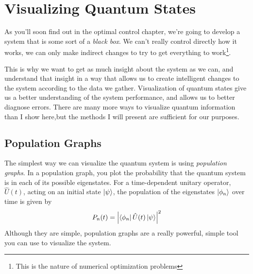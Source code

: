 
\section{Visualizing Quantum States}
As you'll soon find out in the optimal control chapter, we're going to develop a system that is some sort of a \textit{black box}. We can't really control directly how it works, we can only make indirect changes to try to get everything to work\footnote{This is the nature of numerical optimization problems}.

This is why we want to get as much insight about the system as we can, and understand that insight in a way that allows us to create intelligent changes to the system according to the data we gather. Visualization of quantum states give us a better understanding of the system performance, and allows us to better diagnose errors. There are many more ways to visualize quantum information than I show here,but the methods I will present are sufficient for our purposes.

\subsection{Population Graphs}
The simplest way we can visualize the quantum system is using \textit{population graphs}. In a population graph, you plot the probability that the quantum system is in each of its possible eigenstates. For a time-dependent unitary operator, $\hat{U} (t)$, acting on an initial state $\ket{\psi}$, the population of the eigenstates $\ket{\phi_n}$ over time is given by
\[
    P_n (t) = \abs{\bra{\phi_n}\hat{U} (t)\ket{\psi}}^2
\]
Although they are simple, population graphs are a really powerful, simple tool you can use to visualize the system.

